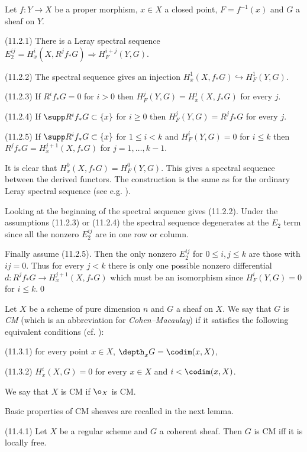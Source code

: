  Let $f:Y\to X$ be a proper morphism, $x\in X$ a closed
point, $F=f^{-1}(x)$ and $G$ a sheaf on $Y$. 

(11.2.1) There is a Leray spectral sequence
$E_2^{ij}=H^i_x(X,R^jf_*G)\Rightarrow H^{i+j}_F(Y,G)$.

(11.2.2) The spectral sequence gives  an injection $H^1_x(X,f_*G)\hookrightarrow
H^1_F(Y,G)$.

(11.2.3) If $R^if_*G=0$ for $i>0$ then $H^j_F(Y,G)=H^j_x(X,f_*G)$ for every $j$.

(11.2.4) If $\supp R^if_*G\subset \{x\}$ for $i\geq 0$ then
$H^j_F(Y,G)=R^jf_*G$ for every $j$.

(11.2.5) If $\supp R^if_*G\subset \{x\}$ for $1\leq i<k$ and
$H^i_F(Y,G)=0$ for $i\leq k$ then
$R^jf_*G=H^{j+1}_x(X,f_*G)$ for   $j=1,\dots,k-1$.
\endproclaim

\demop It is clear that $H^0_x(X,f_*G)= H^0_F(Y,G)$.
This gives a spectral sequence between the derived functors. The
construction is the same as for  the ordinary  Leray spectral sequence
(see e.g. \cite{Griffiths-Harris78, p.462}). 

Looking at the beginning of the spectral sequence gives (11.2.2).
Under the assumptions (11.2.3) or (11.2.4) the spectral sequence degenerates
at the $E_2$ term since all the nonzero $E_2^{ij}$ are in one row or
column.

Finally assume (11.2.5). Then the only nonzero $E_2^{ij}$ for $0\leq
i,j\leq k$ are those with $ij=0$. Thus for every $j<k$ there is only one possible
nonzero differential $d:R^jf_*G\to H^{j+1}_x(X,f_*G)$ which must be an
isomorphism since
$H^i_F(Y,G)=0$ for $i\leq k$.\qed\enddemo


 Let $X$ be a scheme of pure dimension $n$ and $G$ a sheaf
on $X$. We say that $G$ is {\it CM}   (which is an abbreviation for {\it
Cohen--Macaulay})  if  it satisfies the following equivalent conditions
(cf. \cite{Hartshorne77, Exercise III.3.4}):

(11.3.1) for
every point
$x\in X$,
$\depth_xG=\codim (x,X)$, 

(11.3.2) $H^i_x(X,G)=0$ for
every 
$x\in X$ and 
$i<\codim (x,X)$.

We say that $X$ is CM if $\o_X$ is CM.
\enddemo

Basic properties of CM sheaves are recalled in the next  lemma.

  (11.4.1)  Let $X$ be a regular
scheme and
$G$ a coherent sheaf. Then $G$ is CM iff it is locally free.

